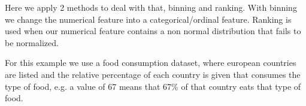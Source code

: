 \documentclass[letterpaper,10pt,english]{jupyterBook}
\begin{document}
\sphinxAtStartPar
Here we apply 2 methods to deal with that, binning and ranking.
With binning we change the numerical feature into a categorical/ordinal feature.
Ranking is used when our numerical feature contains a non normal distribution that fails to be normalized.

\sphinxAtStartPar
For this example we use a food consumption dataset, where european countries are listed and the relative percentage of each country is given that consumes the type of food, e.g. a value of 67 means that 67\% of that country eats that type of food.

\begin{sphinxVerbatim}[commandchars=\\\{\}]
   
 
\end{sphinxVerbatim}

\begin{sphinxVerbatim}[commandchars=\\\{\}]
  
\end{sphinxVerbatim}
\end{document}
